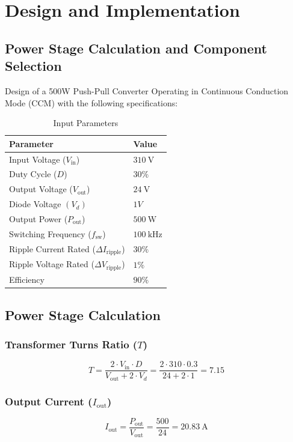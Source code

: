 \section{Design and Implementation}
\subsection{Power Stage Calculation and Component Selection}
Design of a 500W Push-Pull Converter Operating in Continuous Conduction Mode (CCM) with
the following specifications:
\begin{table}[h!]
    \centering
    \begin{tabular}{ll}
        \toprule
        \textbf{Parameter} & \textbf{Value} \\
        \midrule
        Input Voltage ($V_{\text{in}}$) & $\SI{310}{\volt}$ \\
        Duty Cycle ($D$) & $30\% $ \\
        Output Voltage ($V_{\text{out}}$) & $\SI{24}{\volt}$ \\
        Diode Voltage $(V_d)$ & $1V$\\
        Output Power ($P_{\text{out}}$) & $\SI{500}{\watt}$ \\
        Switching Frequency ($f_{\text{sw}}$) & $\SI{100}{\kilo\hertz}$ \\
        Ripple Current Rated ($\Delta I_{\text{ripple}}$) & $30\%$ \\
        Ripple Voltage Rated ($\Delta V_{\text{ripple}}$) & $1\%$ \\
        Efficiency & $90\%$ \\
        \bottomrule
    \end{tabular}
    \caption{Input Parameters}
    \label{tab:system_parameters}
\end{table}
\subsection{Power Stage Calculation}

\subsubsection*{Transformer Turns Ratio (\(T\))}
\begin{equation}
T = \frac{2 \cdot V_{\text{in}} \cdot D}{V_{\text{out}} + 2 \cdot V_d} = \frac{2 \cdot 310 \cdot 0.3}{24 + 2 \cdot 1} = \boxed{7.15}
\end{equation}

\subsubsection*{Output Current (\(I_{\text{out}}\))}
\begin{equation}
I_{\text{out}} = \frac{P_{\text{out}}}{V_{\text{out}}} = \frac{500}{24} = \boxed{\SI{20.83}{\ampere}}
\end{equation}


